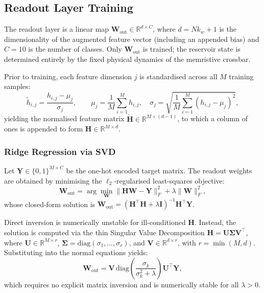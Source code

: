 \documentclass[11pt, oneside]{article}
\begin{document}
\subsection{Readout Layer Training}

The readout layer is a linear map
\(\mathbf{W}_{\mathrm{out}} \in \mathbb{R}^{d \times C}\),
where \(d = Nk_w + 1\) is the dimensionality of the augmented feature vector
(including an appended bias) and \(C = 10\) is the number of classes.
Only \(\mathbf{W}_{\mathrm{out}}\) is trained; the reservoir state is determined
entirely by the fixed physical dynamics of the memristive crossbar.

Prior to training, each feature dimension \(j\) is standardised
across all \(M\) training samples:
\begin{equation}
  \tilde{h}_{i,j} = \frac{h_{i,j} - \mu_j}{\sigma_j},
  \qquad
  \mu_j = \frac{1}{M}\sum_{i=1}^{M} h_{i,j},
  \quad
  \sigma_j = \sqrt{\frac{1}{M}\sum_{i=1}^{M}\!\left(h_{i,j}-\mu_j\right)^{\!2}},
  \label{eq:standardisation}
\end{equation}
yielding the normalised feature matrix
\(\tilde{\mathbf{H}} \in \mathbb{R}^{M \times (d-1)}\),
to which a column of ones is appended to form
\(\mathbf{H} \in \mathbb{R}^{M \times d}\).

\subsubsection{Ridge Regression via SVD}
\label{sec:ridge}

Let \(\mathbf{Y} \in \{0,1\}^{M \times C}\) be the one-hot encoded target matrix.
The readout weights are obtained by minimising the \(\ell_2\)-regularised
least-squares objective:
\begin{equation}
  \mathbf{W}_{\mathrm{out}}
  = \arg\min_{\mathbf{W}}
    \bigl\|\mathbf{H}\mathbf{W} - \mathbf{Y}\bigr\|_F^2
    + \lambda\bigl\|\mathbf{W}\bigr\|_F^2,
  \label{eq:ridge_objective}
\end{equation}
whose closed-form solution is
\(\mathbf{W}_{\mathrm{out}} = \!\left(\mathbf{H}^\top\mathbf{H}
+ \lambda\mathbf{I}\right)^{-1}\!\mathbf{H}^\top\mathbf{Y}\).

Direct inversion is numerically unstable for ill-conditioned \(\mathbf{H}\).
Instead, the solution is computed via the thin Singular Value Decomposition
\(\mathbf{H} = \mathbf{U}\boldsymbol{\Sigma}\mathbf{V}^\top\),
where \(\mathbf{U} \in \mathbb{R}^{M \times r}\),
\(\boldsymbol{\Sigma} = \mathrm{diag}(\sigma_1,\ldots,\sigma_r)\),
and \(\mathbf{V} \in \mathbb{R}^{d \times r}\), with \(r = \min(M,d)\).
Substituting into the normal equations yields:
\begin{equation}
  \mathbf{W}_{\mathrm{out}}
  = \mathbf{V}\,\mathrm{diag}\!\left(\frac{\sigma_k}{\sigma_k^2 + \lambda}\right)
    \mathbf{U}^\top \mathbf{Y},
  \label{eq:ridge_svd}
\end{equation}
which requires no explicit matrix inversion and is numerically stable for
all \(\lambda > 0\).
\end{document}
